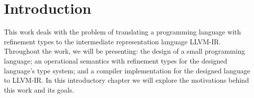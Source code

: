 \documentclass[english, lmodern, oneside, embeddedlogo]{ufsc-thesis-rn46-2019}
\begin{document}
\listoffigures*  %


\tableofcontents*%

\textual%

\chapter{Introduction}\label{chapter:introduction}

This work deals with the problem of translating a programming language with refinement types to the intermediate representation language LLVM-IR.\@
Throughout the work, we will be presenting: the design of a small programming language; an operational semantics with refinement types for the designed language's type system; and a compiler implementation for the designed language to LLVM-IR.\@
In this introductory chapter we will explore the motivations behind this work and its goals.
\end{document}
